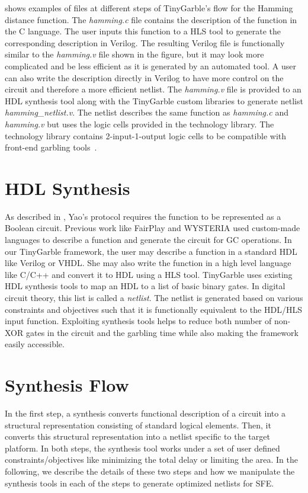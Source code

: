  shows examples of files at different steps of TinyGarble's flow for the Hamming distance function.
The \textsl{hamming.c} file contains the description of the function in the C language.
The user inputs this function to a HLS tool to generate the corresponding description in Verilog.
The resulting Verilog file is functionally similar to the \textsl{hamming.v} file shown in the figure, but it may look more complicated and be less efficient as it is generated by an automated tool.
A user can also write the description directly in Verilog to have more control on the circuit and therefore a more efficient netlist.
The \textsl{hamming.v} file is provided to an HDL synthesis tool along with the TinyGarble custom libraries to generate netlist \textsl{hamming\_netlist.v}.
The netlist describes the same function as \textsl{hamming.c} and \textsl{hamming.v} but uses the logic cells provided in the technology library.
The technology library contains 2-input-1-output logic cells to be compatible with front-end garbling tools~\cite{malkhi2004fairplay, bellare2013efficient}.

\section{HDL Synthesis}
As described in , Yao's protocol requires the function to be represented as a Boolean circuit.
Previous work like FairPlay \cite{malkhi2004fairplay} and WYSTERIA \cite{rastogi2014wysteria} used custom-made languages to describe a function and generate the circuit for GC operations.
In our TinyGarble framework, the user may describe a function in a standard HDL like Verilog or VHDL.
She may also write the function in a high level language like C/C++ and convert it to HDL using a HLS tool.
TinyGarble uses existing HDL synthesis tools to map an HDL to a list of basic binary gates.
In digital circuit theory, this list is called a \emph{netlist}.
The netlist is generated based on various constraints and objectives such that it is functionally equivalent to the HDL/HLS input function.
Exploiting synthesis tools helps to reduce both number of non-XOR gates in the circuit and the garbling time while also making the framework easily accessible.

\section{Synthesis Flow}
In the first step, a synthesis converts functional description of a circuit into a structural representation consisting of standard logical elements.
Then, it converts this structural representation into a netlist specific to the target platform.
In both steps, the synthesis tool works under a set of user defined constraints/objectives like minimizing the total delay or limiting the area.
In the following, we describe the details of these two steps and how we manipulate the synthesis tools in each of the steps to generate optimized netlists for SFE.

